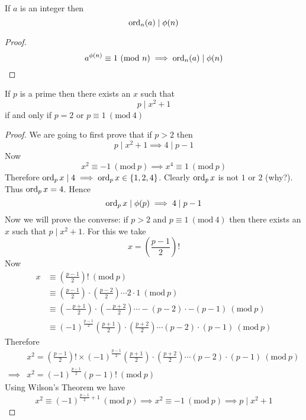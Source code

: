 \documentclass[11pt,numbers=noenddot,svgnames,dvipsnames]{scrartcl}
\renewcommand{\pmod}[1]{\ (\mathrm{mod}\ #1)}
\begin{document}
\begin{corollary}
    If $a$ is an integer then 
    \[
        \operatorname{ord}_{n}(a) \mid \phi(n)
    \]
\end{corollary}
\begin{proof}
    \[
        a^{\phi(n)} \equiv 1 \pmod n \implies \ord_{n}(a) \mid \phi(n)
    \]
\end{proof}
\begin{theorem}
    If $p$ is a prime then there exists an $x$ such that 
    \[
        p \mid x^{2} + 1
    \]
    if and only if $p = 2$ or $p \equiv 1 \pmod{4}$
\end{theorem}
\begin{proof}
    We are going to first prove that if $p>2$ then 
    \[
        p \mid x^{2} + 1 \implies 4 \mid p - 1
    \]
    Now 
    \[
        x^{2} \equiv -1 \pmod p \implies x^{4} \equiv 1 \pmod p
    \]
    Therefore $\operatorname{ord}_{p} x \mid 4 \implies \operatorname{ord}_{p} x \in \{1, 2, 4\}$. 
    Clearly $\operatorname{ord}_{p}x$ is not $1$ or $2$ (why?). Thus $\operatorname{ord}_{p} x = 4$. 
    Hence
    \[
        \operatorname{ord}_{p} x \mid \phi(p) \implies 4 \mid p - 1
    \]
    Now we will prove the converse: if $p > 2$ and $p \equiv 1 \pmod 4$ then there exists 
    an $x$ such that $p \mid x^{2} + 1$. For this we take 
    \[
        x = \left(\frac{p - 1}{2}\right)!
    \]
    Now 
    \begin{align*}
        x & \equiv \left(\frac{p - 1}{2}\right)! \pmod p \\
          & \equiv \left(\frac{p - 1}{2}\right)\cdot \left(\frac{p - 2}{2}\right) \cdots 2 \cdot 1 \pmod p \\
          & \equiv \left(-\frac{p + 1}{2}\right)\cdot \left(-\frac{p + 2}{2}\right) \cdots -(p - 2) \cdot -(p - 1) \pmod p \\
          & \equiv (-1)^{\frac{p-1}{2}} \left(\frac{p + 1}{2}\right)\cdot \left(\frac{p + 2}{2}\right) \cdots (p - 2) \cdot (p - 1) \pmod p
    \end{align*}
    Therefore 
    \begin{align*}
        & x^{2} = \left(\frac{p - 1}{2}\right)! 
        \times (-1)^{\frac{p-1}{2}} \left(\frac{p + 1}{2}\right)\cdot \left(\frac{p + 2}{2}\right) \cdots (p - 2) \cdot (p - 1) \pmod p \\
        \implies & x^{2} = (-1)^{\frac{p - 1}{2}}(p - 1)! \pmod p
    \end{align*}
    Using Wilson's Theorem we have 
    \[
        x^{2} \equiv (-1)^{\frac{p-1}{2} + 1} \pmod p \implies x^{2} \equiv -1 \pmod p \implies p \mid x^{2} + 1
    \]
\end{proof}
\end{document}
